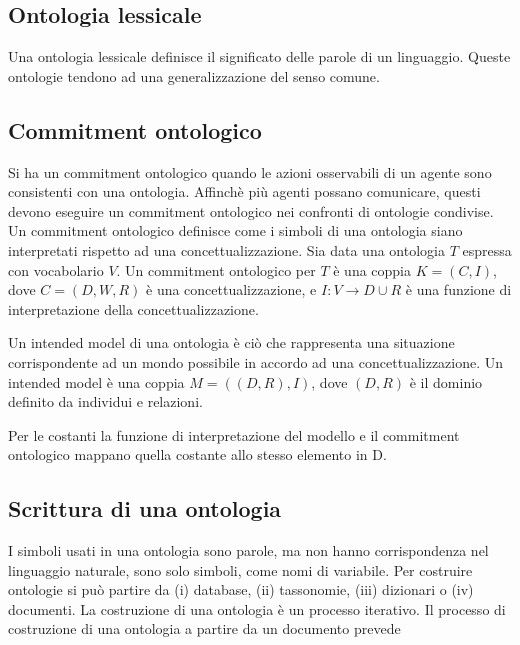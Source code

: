 \subsection{Ontologia lessicale}
Una ontologia lessicale definisce il significato delle parole di un linguaggio. Queste ontologie tendono ad una generalizzazione del senso comune.


\subsection{Commitment ontologico}
Si ha un commitment ontologico quando le azioni osservabili di un agente sono consistenti con una ontologia. Affinchè più agenti possano comunicare, questi devono eseguire un commitment ontologico nei confronti di ontologie condivise.
Un commitment ontologico definisce come i simboli di una ontologia siano interpretati rispetto ad una concettualizzazione.
Sia data una ontologia $T$ espressa con vocabolario $V$.
Un commitment ontologico per $T$ è una coppia $K=(C,I)$, dove $C=(D,W,R)$ è una concettualizzazione, e $I:V\rightarrow D\cup R$ è una funzione di interpretazione della concettualizzazione.

Un intended model di una ontologia è ciò che rappresenta una situazione corrispondente ad un mondo possibile in accordo ad una concettualizzazione.
Un intended model è una coppia $M=((D,R),I)$, dove $(D,R)$ è il dominio definito da individui e relazioni.

Per le costanti la funzione di interpretazione del modello e il commitment ontologico mappano quella costante allo stesso elemento in D.


\subsection{Scrittura di una ontologia}
I simboli usati in una ontologia sono parole, ma non hanno corrispondenza nel linguaggio naturale, sono solo simboli, come nomi di variabile.
Per costruire ontologie si può partire da (i) database, (ii) tassonomie, (iii) dizionari o (iv) documenti.
La costruzione di una ontologia è un processo iterativo.
Il processo di costruzione di una ontologia a partire da un documento prevede 


